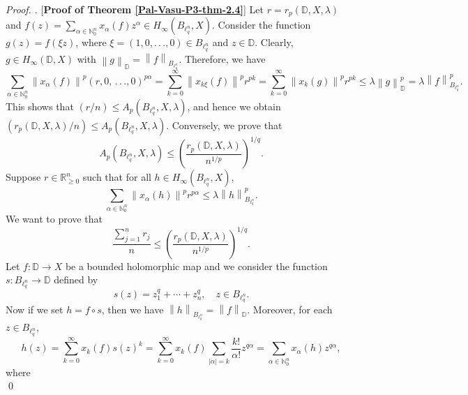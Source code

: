 \documentclass[a4paper,12pt]{amsart}
\theoremstyle{definition}
\newenvironment{pf}[1][]{%
 \vskip 3mm
 \noindent
 \ifthenelse{\equal{#1}{}}%
  {{\slshape Proof. }}%
  {{\slshape #1.} }%
 }%
{\qed\bigskip}
\newcommand{\norm}[1]{\left\lVert#1\right\rVert}
\begin{document}
\vspace{-2mm}
\begin{pf} [{\bf Proof of Theorem \ref{Pal-Vasu-P3-thm-2.4}}]
	Let $r=r_p(\mathbb{D},X,\lambda)$ and $f(z)=\sum_{\alpha\in \mathbb{N}^n_{0}}x_{\alpha}(f)z^{\alpha} \in H_{\infty}(B_{\ell^n_q},X)$.  Consider the function $g(z)=f(\xi z)$, where $\xi=(1, 0,.\,.\,.,0)\in B_{\ell^n_q}$ and $z\in \mathbb{D}$. Clearly, $g\in H_{\infty}(\mathbb{D},X)$ with $\norm{g}_{\mathbb{D}}=\norm{f}_{B_{\ell^n_q}}$.
	Therefore, we have 
	\begin{equation*}
		\sum_{\alpha\in \mathbb{N}^n_{0}}\norm{x_{\alpha}(f)}^p (r,0,\,.\,.\,.,0)^{p\alpha}=\sum_{k=0}^{\infty}\norm{x_{k\xi}(f)}^pr^{pk}=\sum_{k=0}^{\infty}\norm{x_k(g)}^pr^{pk}\leq \lambda \norm{g}^p_{\mathbb{D}}=\lambda\norm{f}^p_{B_{\ell^n_q}}.
	\end{equation*}
	This shows that $(r/n)\leq A_p(B_{\ell^n_q},X,\lambda)$, and hence we obtain $(r_p(\mathbb{D},X,\lambda)/n) \leq A_p(B_{\ell^n_q},X,\lambda).$  Conversely, we prove that 
	\begin{equation*}
		A_p(B_{\ell^n_q},X,\lambda)\leq \left(\frac{r_p(\mathbb{D},X,\lambda)}{n^{1/p}}\right)^{1/q}.
	\end{equation*}
	Suppose $r\in \mathbb{R}^n_{\geq 0}$ such that for all $h \in H_{\infty}(B_{\ell^n_q},X)$,
	\begin{equation*}
		\sum_{\alpha\in \mathbb{N}^n_{0}}\norm{x_{\alpha}(h)}^pr^{p\alpha}\leq \lambda\norm{h}^p_{B_{\ell^n_q}}.
	\end{equation*}
	We want to prove that 
	\begin{equation*}
		\frac{\sum_{j=1}^{n}r_j}{n}\leq \left(\frac{r_p(\mathbb{D},X,\lambda)}{n^{1/p}}\right)^{1/q}.
	\end{equation*}
	Let $f:\mathbb{D}\rightarrow X$ be a bounded holomorphic map and we consider the function $s: B_{\ell^n_q}\rightarrow \mathbb{D}$ defined by 
	\begin{equation*}
		s(z)=z^q_1+\cdots+z^q_n,\quad z\in B_{\ell^n_q}.
	\end{equation*}
	Now if we set $h=f\circ s$, then we have $\norm{h}_{B_{\ell^n_q}}=\norm{f}_{\mathbb{D}}.$
	Moreover, for each $z\in B_{\ell^n_{q}}$,
	\begin{equation*}
		h(z)=\sum_{k=0}^{\infty}x_k(f)s(z)^k=\sum_{k=0}^{\infty}x_k(f)\sum_{|\alpha|=k}\frac{k!}{\alpha!}z^{q\alpha}=\sum_{\alpha\in \mathbb{N}^n_{0}}x_{\alpha}(h)z^{q\alpha},
	\end{equation*}
	where 
	\begin{equation*}

\end{equation*}
\end{pf}
\end{document}
